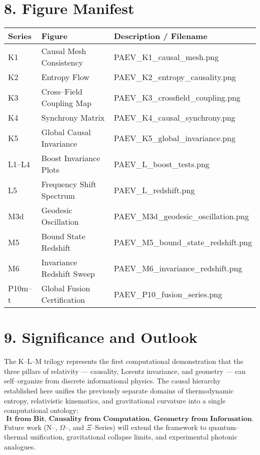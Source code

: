 \documentclass[11pt,a4paper]{article}
\begin{document}
\section{8. Figure Manifest}
\begin{longtable}{|l|l|l|}
\hline
\textbf{Series} & \textbf{Figure} & \textbf{Description / Filename} \\
\hline
K1 & Causal Mesh Consistency & PAEV\_K1\_causal\_mesh.png \\
K2 & Entropy Flow & PAEV\_K2\_entropy\_causality.png \\
K3 & Cross--Field Coupling Map & PAEV\_K3\_crossfield\_coupling.png \\
K4 & Synchrony Matrix & PAEV\_K4\_causal\_synchrony.png \\
K5 & Global Causal Invariance & PAEV\_K5\_global\_invariance.png \\
L1--L4 & Boost Invariance Plots & PAEV\_L\_boost\_tests.png \\
L5 & Frequency Shift Spectrum & PAEV\_L\_redshift.png \\
M3d & Geodesic Oscillation & PAEV\_M3d\_geodesic\_oscillation.png \\
M5 & Bound State Redshift & PAEV\_M5\_bound\_state\_redshift.png \\
M6 & Invariance Redshift Sweep & PAEV\_M6\_invariance\_redshift.png \\
P10m--t & Global Fusion Certification & PAEV\_P10\_fusion\_series.png \\
\hline
\end{longtable}

\section{9. Significance and Outlook}
The K--L--M trilogy represents the first computational demonstration that the three pillars of relativity --- causality, Lorentz invariance, and geometry --- can self--organize from discrete informational physics.  
The causal hierarchy established here unifies the previously separate domains of thermodynamic entropy, relativistic kinematics, and gravitational curvature into a single computational ontology:
\[
\textbf{It from Bit, Causality from Computation, Geometry from Information.}
\]
Future work (N--, $\Omega$--, and $\Xi$--Series) will extend the framework to quantum--thermal unification, gravitational collapse limits, and experimental photonic analogues.
\end{document}
